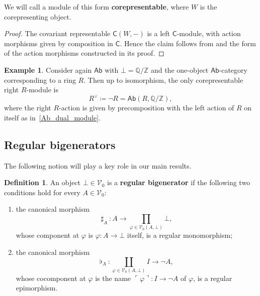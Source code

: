 \documentclass[11pt,onecolumn]{article}
\newcommand{\Z}{\mathbb{Z}}
\newcommand{\Q}{\mathbb{Q}}
\newcommand{\cV}{\mathscr{V}}
\newcommand{\cC}{\mathsf{C}}
\newcommand{\name}[1]{\ulcorner #1 \urcorner}
\newcommand{\Ab}{\mathsf{Ab}}
\theoremstyle{plain}
\theoremstyle{remark}
\theoremstyle{definition}
\newtheorem{definition}[definition]{Definition}
\newtheorem{example}[example]{Example}
\begin{document}
We will call a module of this form \textbf{corepresentable}, where $W$ is the corepresenting object.

\begin{proof}
	The covariant representable $\cC(W,-)$ is a left $\cC$-module, with action morphisms given by composition in $\cC$.
	Hence the claim follows from  and the form of the action morphisms constructed in its proof.
\end{proof}

\begin{example}
	\label{ab_corep}
	Consider again $\Ab$ with $\bot = \Q/\Z$ and the one-object $\Ab$-category corresponding to a ring $R$.
	Then up to isomorphism, the only corepresentable right $R$-module is
	\[
		R^\vee \coloneqq \neg R = \Ab(R, \Q/\Z),
	\]
	where the right $R$-action is given by precomposition with the left action of $R$ on itself as in~\eqref{Ab_dual_module}.
\end{example}

\subsection{Regular bigenerators}
\label{sec:regular_bigenerators}

The following notion will play a key role in our main results.

\begin{definition}
	\label{def:regular_bigenerator}
	An object $\bot \in \cV_0$ is a \textbf{regular bigenerator} if the following two conditions hold for every $A \in \cV_0$:
	\begin{enumerate}
		\item the canonical morphism
			\begin{equation}
				\label{sharp_cond}
				\sharp_A \: \colon A \longrightarrow \prod_{\varphi \in \cV_0(A,\bot)} \bot,
			\end{equation}
			whose component at $\varphi$ is $\varphi \colon A \to \bot$ itself, is a regular monomorphism;
		\item the canonical morphism
			\begin{equation}
				\label{flat_cond}
				\flat_A \: \colon \coprod_{\varphi \in \cV_0(A,\bot)} I \longrightarrow \neg A,
			\end{equation}
			whose cocomponent at $\varphi$ is the name $\name{\varphi} \colon I \to \neg A$ of $\varphi$, is a regular epimorphism.
	\end{enumerate}
\end{definition}
\end{document}
